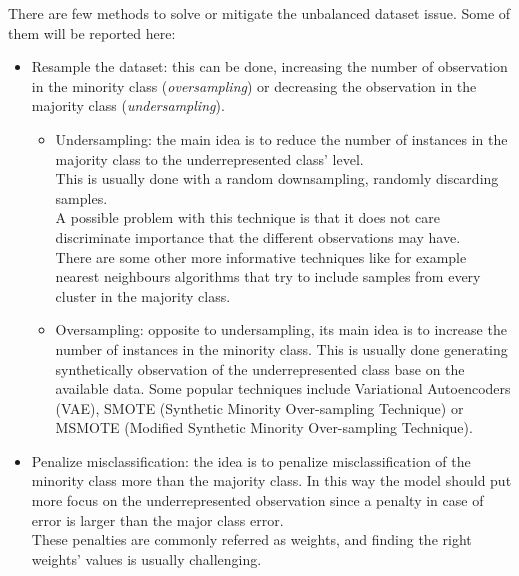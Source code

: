 There are few methods to solve or mitigate the unbalanced dataset issue. Some of them will be reported here:
\begin{itemize}
    \item Resample the dataset: this can be done, increasing the number of observation in the minority class (\emph{oversampling}) or decreasing the observation in the majority class (\emph{undersampling}).
        \begin{itemize}
            \item Undersampling: the main idea is to reduce the number of instances in the majority class to the underrepresented class' level. \\
            This is usually done with a random downsampling, randomly discarding samples.\\
            
            A possible problem with this technique is that it does not care discriminate importance that the different observations may have.\\
            There are some other more informative techniques like for example nearest neighbours algorithms that try to include samples from every cluster in the majority class.
            
            \item Oversampling: opposite to undersampling, its main idea is to increase the number of instances in the minority class. This is usually done generating synthetically observation of the underrepresented class base on the available data. Some popular techniques include Variational Autoencoders (VAE), SMOTE (Synthetic Minority Over-sampling Technique) or MSMOTE (Modified Synthetic Minority Over-sampling Technique).
        \end{itemize}
    \item Penalize misclassification: the idea is to penalize misclassification of the minority class more than the majority class. In this way the model should put more focus on the underrepresented observation since a penalty in case of error is larger than the major class error. \\
    These penalties are commonly referred as weights, and finding the right weights' values is usually challenging.
\end{itemize}




